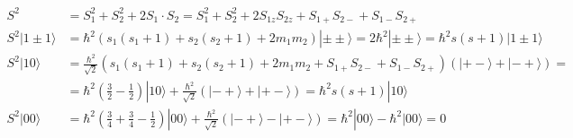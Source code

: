 \documentclass[a4paper,12pt]{article}
\newcommand{\kla}{}
\newcommand{\Ket}{}
\begin{document}
\begin{align*}
S^2&=S_1^2+S_2^2+2S_1\cdot S_2=S_1^2+S_2^2+2S_{1z}S_{2z}+S_{1+}S_{2-}+S_{1-}S_{2+}\\
S^2\Ket | {1\pm 1} \rangle&=\hbar^2\kla\left( {s_1(s_1+1)+s_2(s_2+1)+2m_1m_2} \right)\Ket | {\pm\pm} \rangle=2\hbar^2\Ket | {\pm\pm} \rangle=\hbar^2s(s+1)\Ket | {1\pm 1} \rangle\\
S^2\Ket | {10} \rangle&=\frac{\hbar^2}{\sqrt{2}}\kla\left( {s_1(s_1+1)+s_2(s_2+1)+2m_1m_2+S_{1+}S_{2-}+S_{1-}S_{2+}} \right)\kla\left( {\Ket | {+-} \rangle+\Ket | {-+} \rangle} \right)=\\
&=\hbar^2\kla\left( {\frac{3}{2}-\frac{1}{2}} \right)\Ket | {10} \rangle+\frac{\hbar^2}{\sqrt{2}}\kla\left( {\Ket | {-+} \rangle+\Ket | {+-} \rangle} \right)=\hbar^2s(s+1)\Ket | {10} \rangle\\
S^2\Ket | {00} \rangle&=\hbar^2\kla\left( {\frac{3}{4}+\frac{3}{4}-\frac{1}{2}} \right)\Ket | {00} \rangle+\frac{\hbar^2}{\sqrt{2}}\kla\left( {\Ket | {-+} \rangle-\Ket | {+-} \rangle} \right)=\hbar^2\Ket | {00} \rangle-\hbar^2\Ket | {00} \rangle=0
\end{align*}
\end{document}

